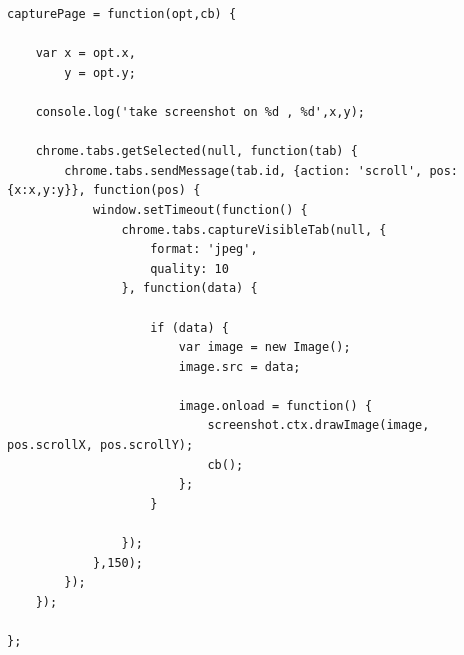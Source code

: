 \begin{lstlisting}[caption=Funktion zum Abscannen des aktuell sichtbaren Bereiches der Seite,label=captureVisibleTab]
capturePage = function(opt,cb) {

    var x = opt.x,
        y = opt.y;

    console.log('take screenshot on %d , %d',x,y);

    chrome.tabs.getSelected(null, function(tab) {
        chrome.tabs.sendMessage(tab.id, {action: 'scroll', pos: {x:x,y:y}}, function(pos) {
            window.setTimeout(function() {
                chrome.tabs.captureVisibleTab(null, {
                    format: 'jpeg',
                    quality: 10
                }, function(data) {

                    if (data) {
                        var image = new Image();
                        image.src = data;

                        image.onload = function() {
                            screenshot.ctx.drawImage(image, pos.scrollX, pos.scrollY);
                            cb();
                        };
                    }

                });
            },150);
        });
    });

};
\end{lstlisting}

